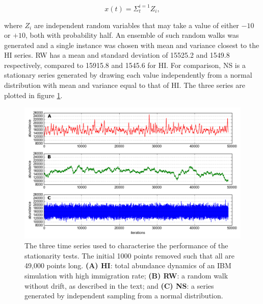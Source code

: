\begin{equation}
	x(t) = \Sigma_{t}^{i=1} Z_i, 
\end{equation}   

where $Z_i$ are independent random variables that may take a value of either $-10$ or $+10$, both with probability half. An ensemble of such random walks was generated and a single instance was chosen with mean and variance closest to the HI series. RW has a mean and standard deviation of 15525.2 and 1549.8 respectively, compared to 15915.8 and 1545.6 for HI. For comparison, NS is a stationary series generated by drawing each value independently from a normal distribution with mean and variance  equal to that of HI. The three series are plotted in figure \ref{fig:adf}.
  
  
\begin{figure}[ht]
	\centering
	\includegraphics[width=0.8\linewidth]{"./chapters/chapter04b/figures/hi_rw_ns_dynamics"}
     \caption{The three time series used to characterise the performance of the stationarity tests. The initial 1000 points removed such that all are 49,000 points long. \textbf{(A) HI}: total abundance dynamics of an IBM simulation with high immigration rate; \textbf{(B) RW}: a random walk without drift, as described in the text; and \textbf{(C) NS}: a series generated by independent sampling from a normal distribution.} 
     \label{fig:adf}   
\end{figure}

